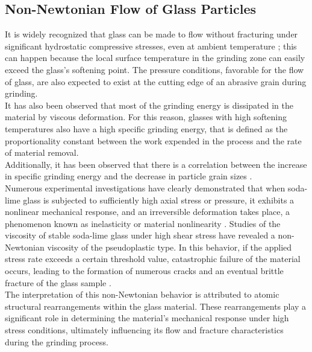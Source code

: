 \subsection{Non-Newtonian Flow of Glass Particles}
It is widely recognized that glass can be made to flow without fracturing under significant hydrostatic compressive stresses, even at ambient temperature \cite{bridgmanEffectsVeryHigh1953}; this can happen because the local surface temperature in the grinding zone can easily exceed the glass's softening point. The pressure conditions, favorable for the flow of glass, are also expected to exist at the cutting edge of an abrasive grain during grinding.
\\
It has also been observed that most of the grinding energy is dissipated in the material by viscous deformation. For this reason, glasses with high softening temperatures also have a high specific grinding energy, that is defined as the proportionality constant between the work expended in the process and the rate of material removal.
\\
Additionally, it has been observed that there is a correlation between the increase in specific grinding energy and the decrease in particle grain sizes \cite{huertaGrindingGlassMechanics1976}.
\\
Numerous experimental investigations have clearly demonstrated that when soda-lime glass is subjected to sufficiently high axial stress or pressure, it exhibits a nonlinear mechanical response, and an irreversible deformation takes place, a phenomenon known as inelasticity or material nonlinearity \cite{grujicicInclusionMaterialNonlinearity2012}. Studies of the viscosity of stable soda-lime glass under high shear stress have revealed a non-Newtonian viscosity of the pseudoplastic type. In this behavior, if the applied stress rate exceeds a certain threshold value, catastrophic failure of the material occurs, leading to the formation of numerous cracks and an eventual brittle fracture of the glass sample \cite{simmonsNonNewtonianViscous1982}.
\\
The interpretation of this non-Newtonian behavior is attributed to atomic structural rearrangements within the glass material. These rearrangements play a significant role in determining the material's mechanical response under high stress conditions, ultimately influencing its flow and fracture characteristics during the grinding process.

